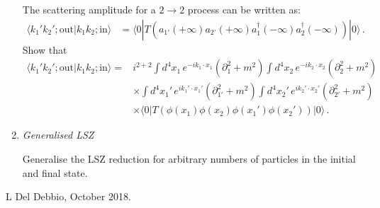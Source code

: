 \documentclass[12pt,a4paper]{article}
\begin{document}
\begin{enumerate}
    The scattering amplitude for a $2\rightarrow 2$ process can be
    written as: 
    \begin{align}
      \label{eq:4}
      \langle k_1' k_2';\mathrm{out} | k_1 k_2; \mathrm{in} \rangle 
      &= \langle 0 | T\left(
        a_{1'}(+\infty) a_{2'}(+\infty) 
        a_1^\dagger(-\infty) a_2^\dagger(-\infty)
        \right) |0 \rangle\, .
    \end{align}
    Show that
    \begin{align}
      \label{eq:5}
      \langle k_1' k_2';\mathrm{out} | k_1 k_2; \mathrm{in} \rangle 
      =&  i^{2+2} 
         \int d^4x_1\, e^{-i k_1\cdot x_1} \left(\partial_1^2 + m^2\right)  
         \int d^4x_2\, e^{-i k_2\cdot x_2} \left(\partial_2^2 +
         m^2\right)  \nonumber \\
      & \times \int d^4x_1'\, e^{i k_1'\cdot x_1'} \left(\partial_{1'}^2 + m^2\right)  
         \int d^4x_2'\, e^{i k_2'\cdot x_2'} \left(\partial_{2'}^2 +
        m^2\right) \nonumber \\
      & \times \langle 0 | T\left(
        \phi(x_1) \phi(x_2) \phi(x_1') \phi(x_2')
        \right) |0 \rangle\, .        
    \end{align}

\item \emph{ Generalised LSZ}

  Generalise the LSZ reduction for arbitrary numbers of particles in
  the initial and final state. 

\end{enumerate}

\vfill
\hspace*{\fill}\tiny L Del Debbio, October 2018.
\end{document}
